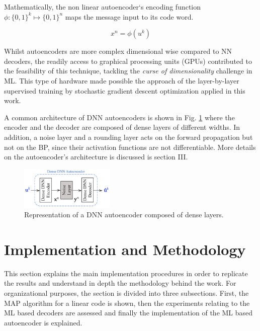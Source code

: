 \documentclass[conference]{IEEEtran}
\begin{document}
Mathematically, the non linear autoencoder`s encoding function $\phi: \{0,1\}^k \mapsto \{0,1\}^n $ maps the message input to its code word. 

\begin{equation}
x^n = \phi (u^k)
\end{equation} 

Whilst autoencoders are more complex dimensional wise compared to NN decoders, the readily access to graphical processing units (GPUs) contributed to the feasibility of this technique, tackling the \textit{curse of dimensionality} challenge in ML. This type of hardware made possible the approach of the layer-by-layer supervised training by stochastic gradient descent optimization applied in this work. \cite{doi:10.1162/neco.2006.18.7.1527}

A common architecture of DNN autoencoders is shown in Fig. \ref{fig:DDNNAutoencoder} where the encoder and the decoder are composed of dense layers of different widths. In addition, a noise layer and a rounding layer acts on the forward propagation but not on the BP, since their activation functions are not differentiable. More details on the autoencoder's architecture is discussed is section III.  


\begin{figure}[!ht]
  \centering
    \includegraphics[width=0.4\textwidth]{images/DNN_autoencoder}
    \caption{Representation of a DNN autoencoder composed of dense layers.}\label{fig:DDNNAutoencoder}
\end{figure}



\section{Implementation and Methodology}
This section explains the main implementation procedures in order to replicate the results and understand in depth the methodology behind the work. For organizational purposes, the section is divided into three subsections. First, the MAP algorithm for a linear code is shown, then the experiments relating to the ML based decoders are assessed and finally the implementation of the ML based autoencoder is explained. 
\end{document}
